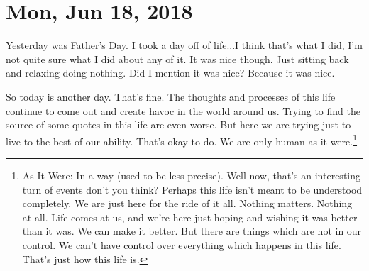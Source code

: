 \section{Mon, Jun 18, 2018}

Yesterday was Father's Day. I took a day off of life...I think that's what I
did, I'm not quite sure what I did about any of it. It was nice though. Just
sitting back and relaxing doing nothing. Did I mention it was nice? Because it
was nice.

So today is another day. That's fine. The thoughts and processes of this life
continue to come out and create havoc in the world around us. Trying to find the
source of some quotes in this life are even worse. But here we are trying just
to live to the best of our ability. That's okay to do. We are only human as it
were.\footnote{As It Were: In a way (used to be less precise). Well now, that's 
an interesting turn of events don't you think? Perhaps this life isn't meant to
be understood completely. We are just here for the ride of it all. Nothing
matters. Nothing at all. Life comes at us, and we're here just hoping and
wishing it was better than it was. We can make it better. But there are
things which are not in our control. We can't have control over everything which
happens in this life. That's just how this life is.}